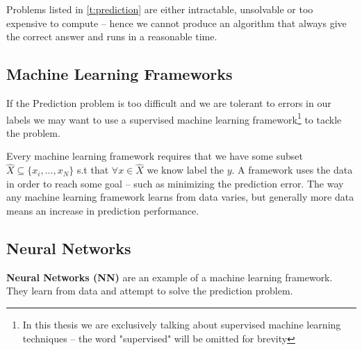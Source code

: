\documentclass[dissertation.tex]{subfiles}
\begin{document}
Problems listed in \autoref{t:prediction} are either intractable, unsolvable or
too expensive to compute -- hence we cannot produce an algorithm that always
give the correct answer and runs in a reasonable time.

\subsection{Machine Learning Frameworks}

If the Prediction problem is too difficult and we are tolerant to errors in our
labels we may want to use a supervised machine learning framework\footnote{In
this thesis we are exclusively talking about supervised machine learning
techniques -- the word "supervised" will be omitted for brevity} to tackle the
problem. 

Every machine learning framework requires that we have some subset
$\hat{X}\subseteq\{x_i,...,x_N\}$ s.t that $ \forall x\in\hat{X}$ we know label
the $y$. A framework uses the data in order to reach some goal -- such as
minimizing the prediction error. The way any machine learning framework learns
from data varies, but generally more data means an increase in prediction
performance.

\subsection{Neural Networks} 

\textbf{Neural Networks (NN)} are an example of a machine learning framework. They learn
from data and attempt to solve the prediction problem.
\end{document}
